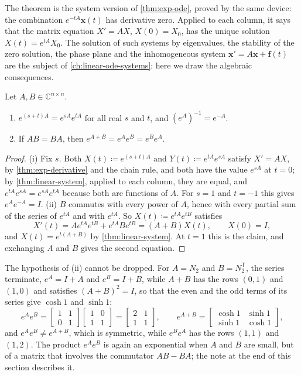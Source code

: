 The theorem is the system version of \cref{thm:exp-ode}, proved by the same device: the combination $e^{-tA}\mathbf x(t)$ has derivative zero. Applied to each column, it says that the matrix equation $X'=AX$, $X(0)=X_0$, has the unique solution $X(t)=e^{tA}X_0$. The solution of such systems by eigenvalues, the stability of the zero solution, the phase plane and the inhomogeneous system $\mathbf x'=A\mathbf x+\mathbf f(t)$ are the subject of \cref{ch:linear-ode-systems}; here we draw the algebraic consequences.


\begin{corollary}
\label{cor:exp-laws}
Let $A,B\in\mathbb C^{n\times n}$.
\begin{enumerate}
\item $e^{(s+t)A}=e^{sA}e^{tA}$ for all real $s$ and $t$, and $(e^A)^{-1}=e^{-A}$.
\item If $AB=BA$, then $e^{A+B}=e^Ae^B=e^Be^A$.
\end{enumerate}
\end{corollary}

\begin{proof}
(i) Fix $s$. Both $X(t)\coloneqq e^{(s+t)A}$ and $Y(t)\coloneqq e^{tA}e^{sA}$ satisfy $X'=AX$, by \cref{thm:exp-derivative} and the chain rule, and both have the value $e^{sA}$ at $t=0$; by \cref{thm:linear-system}, applied to each column, they are equal, and $e^{tA}e^{sA}=e^{sA}e^{tA}$ because both are functions of $A$. For $s=1$ and $t=-1$ this gives $e^Ae^{-A}=I$. (ii) $B$ commutes with every power of $A$, hence with every partial sum of the series of $e^{tA}$ and with $e^{tA}$. So $X(t)\coloneqq e^{tA}e^{tB}$ satisfies
\[
X'(t)=Ae^{tA}e^{tB}+e^{tA}Be^{tB}=(A+B)X(t),\qquad X(0)=I ,
\]
and $X(t)=e^{t(A+B)}$ by \cref{thm:linear-system}. At $t=1$ this is the claim, and exchanging $A$ and $B$ gives the second equation.
\end{proof}

The hypothesis of (ii) cannot be dropped. For $A=N_2$ and $B=N_2^{\mathsf T}$, the series terminate, $e^A=I+A$ and $e^B=I+B$, while $A+B$ has the rows $(0,1)$ and $(1,0)$ and satisfies $(A+B)^2=I$, so that the even and the odd terms of its series give $\cosh1$ and $\sinh1$:
\[
e^Ae^B=\begin{bmatrix}1&1\\0&1\end{bmatrix}\begin{bmatrix}1&0\\1&1\end{bmatrix}=\begin{bmatrix}2&1\\1&1\end{bmatrix},\qquad e^{A+B}=\begin{bmatrix}\cosh1&\sinh1\\\sinh1&\cosh1\end{bmatrix},
\]
and $e^Ae^B\ne e^{A+B}$, which is symmetric, while $e^Be^A$ has the rows $(1,1)$ and $(1,2)$. The product $e^Ae^B$ is again an exponential when $A$ and $B$ are small, but of a matrix that involves the commutator $AB-BA$; the note at the end of this section describes it.

